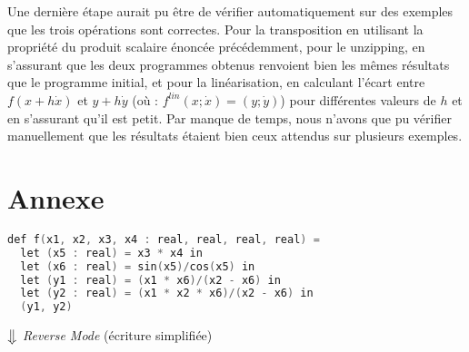 \documentclass[a4paper, french, 11pt]{article}
\begin{document}
Une dernière étape aurait pu être de vérifier automatiquement sur des exemples que les trois opérations sont correctes. Pour la transposition en utilisant la propriété du produit scalaire énoncée précédemment, pour le unzipping, en s'assurant que les deux programmes obtenus renvoient bien les mêmes résultats que le programme initial, et pour la linéarisation, en calculant l'écart entre $f(x + h\dot x)$ et $y + h\dot y$ (où : $f^{lin}(x; \dot x) = (y; \dot y)$) pour différentes valeurs de $h$ et en s'assurant qu'il est petit. Par manque de temps, nous n'avons que pu vérifier manuellement que les résultats étaient bien ceux attendus sur plusieurs exemples.





\section{Annexe}

\begin{lstlisting}[style=myStyle, language=C]
def f(x1, x2, x3, x4 : real, real, real, real) =
  let (x5 : real) = x3 * x4 in
  let (x6 : real) = sin(x5)/cos(x5) in
  let (y1 : real) = (x1 * x6)/(x2 - x6) in
  let (y2 : real) = (x1 * x2 * x6)/(x2 - x6) in
  (y1, y2)
\end{lstlisting}  

\begin{center}
  $\big\Downarrow$ \textit{Reverse Mode} (écriture simplifiée)
\end{center}  
\end{document}
